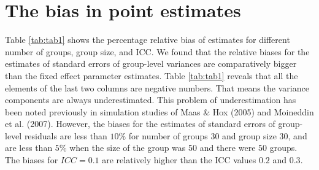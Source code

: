 \documentclass[12pt,oneside,a4paper]{reedthesis}
\begin{document}
\hypertarget{the-bias-in-point-estimates}{%
\section{The bias in point estimates}\label{the-bias-in-point-estimates}}

Table \ref{tab:tab1} shows the percentage relative bias of estimates for different number of groups, group size, and ICC. We found that the relative biases for the estimates of standard errors of group-level variances are comparatively bigger than the fixed effect parameter estimates. Table \ref{tab:tab1} reveals that all the elements of the last two columns are negative numbers. That means the variance components are always underestimated. This problem of underestimation has been noted previously in simulation studies of Maas \& Hox (2005) and Moineddin et al. (2007).
However, the biases for the estimates of standard errors of group-level residuals are less than \(10\%\) for number of groups \(30\) and group size \(30\), and are less than \(5\%\) when the size of the group was 50 and there were \(50\) groups. The biases for \(ICC=0.1\) are relatively higher than the ICC values \(0.2\) and \(0.3\).
\end{document}
